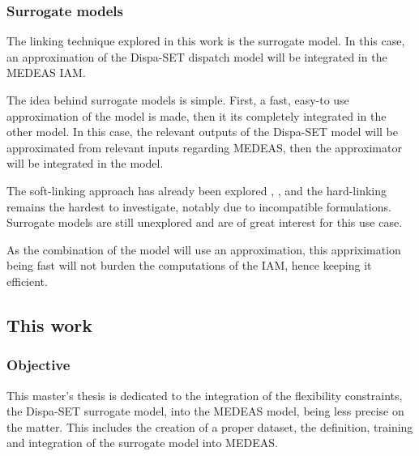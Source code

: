 \subsubsection{Surrogate models}

The linking technique explored in this work is the surrogate model. In this case, an approximation of the Dispa-SET dispatch model will be integrated in the MEDEAS IAM. 

The idea behind surrogate models is simple. First, a fast, easy-to use approximation of the model is made, then it its completely integrated in the other model. In this case, the relevant outputs of the Dispa-SET model will be approximated from relevant inputs regarding MEDEAS, then the approximator will be integrated in the model.

The soft-linking approach has already been explored \cite{Brinkerink2022-softlink}, \cite{DEane2012-softlink}, and the hard-linking remains the hardest to investigate, notably due to incompatible formulations. Surrogate models are still unexplored and are of great interest for this use case.

As the combination of the model will use an approximation, this appriximation being fast will not burden the computations of the IAM, hence keeping it efficient.

\subsection{This work}

\subsubsection{Objective}

This master's thesis is dedicated to the integration of the flexibility constraints, the Dispa-SET surrogate model, into the MEDEAS model, being less precise on the matter. This includes the creation of a proper dataset, the definition, training and integration of the surrogate model into MEDEAS.



